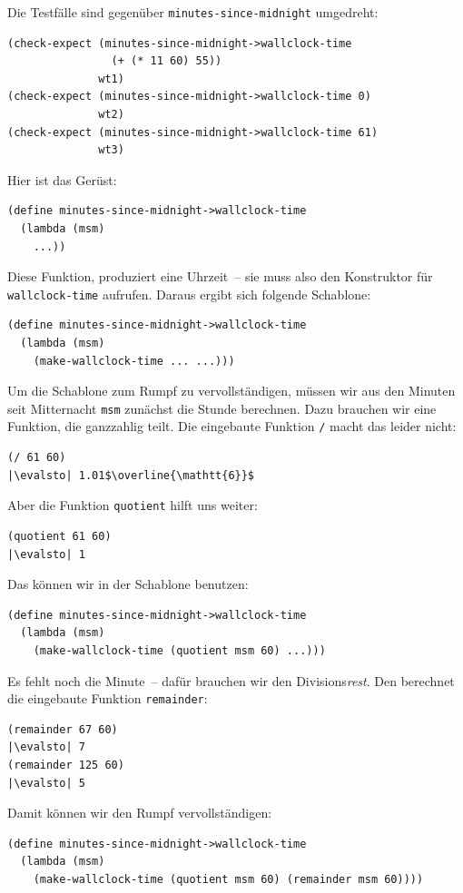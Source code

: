 Die Testfälle sind gegenüber
\lstinline{minutes-since-midnight} umgedreht:
%
\begin{lstlisting}
(check-expect (minutes-since-midnight->wallclock-time
                (+ (* 11 60) 55))
              wt1)
(check-expect (minutes-since-midnight->wallclock-time 0)
              wt2)
(check-expect (minutes-since-midnight->wallclock-time 61)
              wt3)
\end{lstlisting}
%
Hier ist das Gerüst:
%
\begin{lstlisting}
(define minutes-since-midnight->wallclock-time
  (lambda (msm)
    ...))
\end{lstlisting}
%
Diese Funktion, produziert eine Uhrzeit~-- sie muss also
den Konstruktor für \lstinline{wallclock-time} aufrufen.  Daraus ergibt
sich folgende Schablone:
%
\begin{lstlisting}
(define minutes-since-midnight->wallclock-time
  (lambda (msm)
    (make-wallclock-time ... ...)))
\end{lstlisting}
% 
Um die Schablone zum Rumpf zu vervollständigen, müssen wir aus den
Minuten seit Mitternacht \lstinline{msm} zunächst die Stunde berechnen.
Dazu brauchen wir eine Funktion, die ganzzahlig teilt.  Die eingebaute
Funktion \lstinline{/} macht das leider nicht:
%
\begin{lstlisting}
(/ 61 60)
|\evalsto| 1.01$\overline{\mathtt{6}}$
\end{lstlisting}
%
Aber die Funktion \lstinline{quotient} hilft uns weiter:\label{func:quotient}
%
\begin{lstlisting}
(quotient 61 60)
|\evalsto| 1
\end{lstlisting}
%
Das können wir in der Schablone benutzen:
%
\begin{lstlisting}
(define minutes-since-midnight->wallclock-time
  (lambda (msm)
    (make-wallclock-time (quotient msm 60) ...)))
\end{lstlisting}
%
Es fehlt noch die Minute~-- dafür brauchen wir den
Divisions\emph{rest}.  Den berechnet die eingebaute Funktion
\lstinline{remainder}:
%
\begin{lstlisting}
(remainder 67 60)
|\evalsto| 7
(remainder 125 60)
|\evalsto| 5
\end{lstlisting}
%
Damit können wir den Rumpf vervollständigen:
%
\begin{lstlisting}
(define minutes-since-midnight->wallclock-time
  (lambda (msm)
    (make-wallclock-time (quotient msm 60) (remainder msm 60))))
\end{lstlisting}

